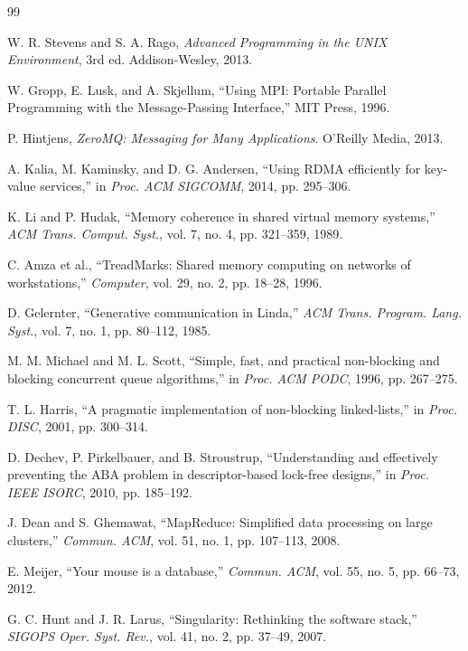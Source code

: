 \documentclass[10pt,conference]{IEEEtran}
\begin{document}
\begin{thebibliography}{99}

W. R. Stevens and S. A. Rago, \emph{Advanced Programming in the UNIX Environment}, 3rd ed. Addison-Wesley, 2013.

W. Gropp, E. Lusk, and A. Skjellum, ``Using MPI: Portable Parallel Programming with the Message-Passing Interface,'' MIT Press, 1996.

P. Hintjens, \emph{ZeroMQ: Messaging for Many Applications}. O'Reilly Media, 2013.

A. Kalia, M. Kaminsky, and D. G. Andersen, ``Using RDMA efficiently for key-value services,'' in \emph{Proc. ACM SIGCOMM}, 2014, pp. 295--306.

K. Li and P. Hudak, ``Memory coherence in shared virtual memory systems,'' \emph{ACM Trans. Comput. Syst.}, vol. 7, no. 4, pp. 321--359, 1989.

C. Amza et al., ``TreadMarks: Shared memory computing on networks of workstations,'' \emph{Computer}, vol. 29, no. 2, pp. 18--28, 1996.

D. Gelernter, ``Generative communication in Linda,'' \emph{ACM Trans. Program. Lang. Syst.}, vol. 7, no. 1, pp. 80--112, 1985.

M. M. Michael and M. L. Scott, ``Simple, fast, and practical non-blocking and blocking concurrent queue algorithms,'' in \emph{Proc. ACM PODC}, 1996, pp. 267--275.

T. L. Harris, ``A pragmatic implementation of non-blocking linked-lists,'' in \emph{Proc. DISC}, 2001, pp. 300--314.

D. Dechev, P. Pirkelbauer, and B. Stroustrup, ``Understanding and effectively preventing the ABA problem in descriptor-based lock-free designs,'' in \emph{Proc. IEEE ISORC}, 2010, pp. 185--192.

J. Dean and S. Ghemawat, ``MapReduce: Simplified data processing on large clusters,'' \emph{Commun. ACM}, vol. 51, no. 1, pp. 107--113, 2008.

E. Meijer, ``Your mouse is a database,'' \emph{Commun. ACM}, vol. 55, no. 5, pp. 66--73, 2012.

G. C. Hunt and J. R. Larus, ``Singularity: Rethinking the software stack,'' \emph{SIGOPS Oper. Syst. Rev.}, vol. 41, no. 2, pp. 37--49, 2007.


\end{thebibliography}
\end{document}
